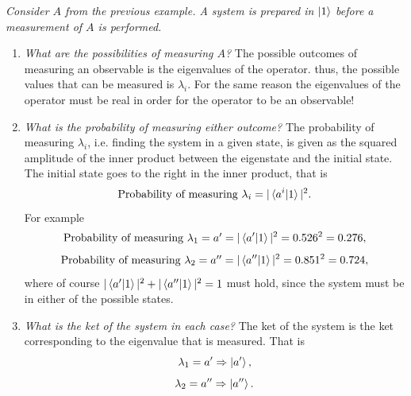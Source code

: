 \begin{example}
	\emph{Consider $A$ from the previous example. A system is prepared in $\ket{1}$ before a measurement of $A$ is performed.}\newline
	
	\begin{enumerate}
		\item \emph{What are the possibilities of measuring $A$?}\newline
		The possible outcomes of measuring an observable is the eigenvalues of the operator. thus, the possible values that can be measured is $\lambda_i$. For the same reason the eigenvalues of the operator must be real in order for the operator to be an observable! \newline
		\item \emph{What is the probability of measuring either outcome?}\newline
		The probability of measuring $\lambda_i$, i.e. finding the system in a given state, is given as the squared amplitude of the inner product between the eigenstate and the initial state. The initial state goes to the right in the inner product, that is
		\begin{equation}
			\mbox{Probability of measuring $\lambda_i$}=|\braket{a^i|1}|^2.
		\end{equation} 
		For example
		\begin{equation}
			\mbox{Probability of measuring $\lambda_1=a'$}=|\braket{a'|1}|^2=0.526^2=0.276,
		\end{equation} 
		\begin{equation}
			\mbox{Probability of measuring $\lambda_2=a''$}=|\braket{a''|1}|^2=0.851^2=0.724,
		\end{equation} 
		where of course $|\braket{a'|1}|^2+|\braket{a''|1}|^2=1$ must hold, since the system must be in either of the possible states.\newline	
		
		\item \emph{What is the ket of the system in each case?}\newline
		The ket of the system is the ket corresponding to the eigenvalue that is measured. That is
		\begin{equation}
			\lambda_1=a'\Rightarrow\ket{a'},
		\end{equation} 
		\begin{equation}
			\lambda_2=a''\Rightarrow\ket{a''}.
		\end{equation} 
		
	\end{enumerate}
\end{example}

